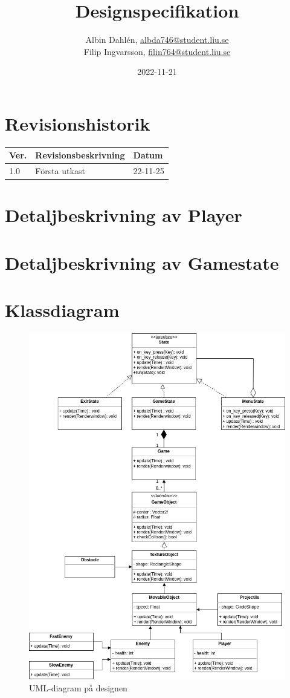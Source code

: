 \documentclass{TDP005mall}
\author{Albin Dahlén, \url{albda746@student.liu.se}\\
  Filip Ingvarsson, \url{filin764@student.liu.se}}
\title{Designspecifikation}
\date{2022-11-21}
\begin{document}
\projectpage
\section{Revisionshistorik}
\begin{table}[!h]
\begin{tabularx}{\linewidth}{|l|X|l|}
\hline
Ver. & Revisionsbeskrivning & Datum \\\hline
1.0 & Första utkast & 22-11-25 \\\hline
\end{tabularx}
\end{table}

\section{Detaljbeskrivning av Player}

\section{Detaljbeskrivning av Gamestate}

\section{Klassdiagram}


\begin{figure}[!h]
  \begin{center}
  \includegraphics[width=0.95\linewidth]{uml.png}
  \caption {UML-diagram på designen}
  \label {fig:picture}
  \end{center}
\end {figure}
\end{document}
